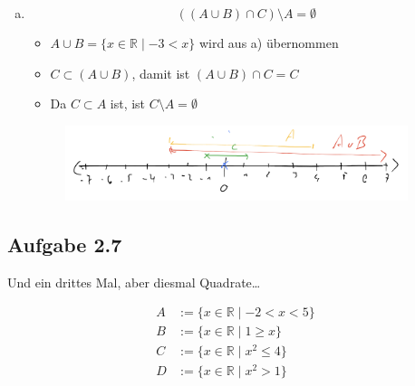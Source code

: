 \documentclass{standalone}
\begin{document}
\begin{enumerate}[a)]
    \item $$ ((A \cup B) \cap C) \setminus A = \emptyset$$
    \begin{itemize}
        \item $A \cup B = \{x \in \mathbb{R} \mid -3 < x\}$ wird aus a) übernommen
        \item $C \subset (A \cup B)$, damit ist $(A\cup B) \cap C = C$
        \item Da $C \subset A$ ist, ist $C\setminus A = \emptyset$
    \end{itemize}
    \begin{figure}[htpb]
        \centering
        \includegraphics[width=10cm]{img/2_6_d}
    \end{figure}
    \FloatBarrier
\end{enumerate}

\subsection{Aufgabe 2.7}
Und ein drittes Mal, aber diesmal Quadrate\dots

\begin{align}
    A&:=\{x \in \mathbb{R} \mid -2 < x < 5\} \\
    B&:=\{x \in \mathbb{R} \mid 1 \geq x\} \\
    C&:=\{x \in \mathbb{R} \mid x^2 \leq 4\} \\
    D&:=\{x \in \mathbb{R} \mid x^2 > 1\}
\end{align}
\end{document}
